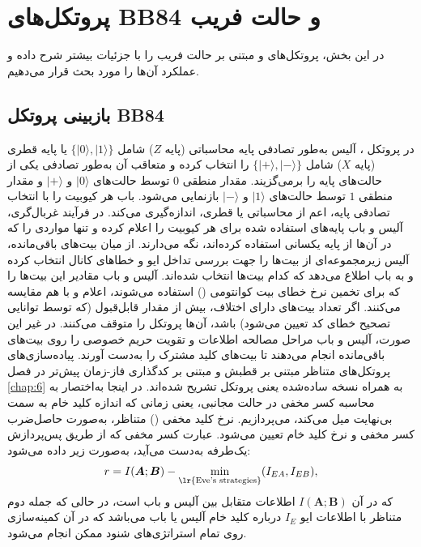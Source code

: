 \section{پروتکل‌های BB84 و حالت فریب}
\label{sec:8-1}
در این بخش، پروتکل‌های  و مبتنی بر حالت فریب را با جزئیات بیشتر شرح داده و عملکرد آن‌ها را مورد بحث قرار می‌دهیم.

\subsection{بازبینی پروتکل BB84}
\label{subsec:8-1-1}
در پروتکل  \cite{8-1, 8-2, 8-3, 8-4, 8-5}، آلیس به‌طور تصادفی پایه محاسباتی (پایه $Z$) شامل $\{|0\rangle, |1\rangle\}$ یا پایه قطری (پایه $X$) شامل $\{|+\rangle, |-\rangle\}$ را انتخاب کرده و متعاقب آن به‌طور تصادفی یکی از حالت‌های پایه را برمی‌گزیند. مقدار منطقی $0$ توسط حالت‌های $|0\rangle$ و $|+\rangle$ و مقدار منطقی $1$ توسط حالت‌های $|1\rangle$ و $|-\rangle$ بازنمایی می‌شود. باب هر کیوبیت را با انتخاب تصادفی پایه، اعم از محاسباتی یا قطری، اندازه‌گیری می‌کند. در فرآیند غربال‌گری، آلیس و باب پایه‌های استفاده شده برای هر کیوبیت را اعلام کرده و تنها مواردی را که در آن‌ها از پایه یکسانی استفاده کرده‌اند، نگه می‌دارند. از میان بیت‌های باقی‌مانده، آلیس زیرمجموعه‌ای از بیت‌ها را جهت بررسی تداخل ایو و خطاهای کانال انتخاب کرده و به باب اطلاع می‌دهد که کدام بیت‌ها انتخاب شده‌اند. آلیس و باب مقادیر این بیت‌ها را که برای تخمین نرخ خطای بیت کوانتومی () استفاده می‌شوند، اعلام و با هم مقایسه می‌کنند. اگر تعداد بیت‌های دارای اختلاف، بیش از مقدار قابل‌قبول (که توسط توانایی تصحیح خطای کد تعیین می‌شود) باشد، آن‌ها پروتکل را متوقف می‌کنند. در غیر این صورت، آلیس و باب مراحل مصالحه اطلاعات و تقویت حریم خصوصی را روی بیت‌های باقی‌مانده انجام می‌دهند تا بیت‌های کلید مشترک را به‌دست آورند. پیاده‌سازی‌های پروتکل‌های  متناظر مبتنی بر قطبش و مبتنی بر کدگذاری فاز-زمان پیش‌تر در فصل \ref{chap:6} به همراه نسخه ساده‌شده یعنی پروتکل  \cite{8-6} تشریح شده‌اند. در اینجا به‌اختصار به محاسبه کسر مخفی در حالت مجانبی، یعنی زمانی که اندازه کلید خام به سمت بی‌نهایت میل می‌کند، می‌پردازیم. نرخ کلید مخفی () متناظر، به‌صورت حاصل‌ضرب کسر مخفی و نرخ کلید خام تعیین می‌شود. عبارت کسر مخفی که از طریق پس‌پردازش یک‌طرفه به‌دست می‌آید، به‌صورت زیر داده می‌شود:
\begin{equation}
	r = I(\bm{A}; \bm{B}) - \min_{\text{\lr{Eve's strategies}}} (I_{EA}, I_{EB}),
	\label{eq:8-1}
\end{equation}
که در آن $I(\bm{A}; \bm{B})$ اطلاعات متقابل بین آلیس و باب است، در حالی که جمله دوم متناظر با اطلاعات ایو $I_E$ درباره کلید خام آلیس یا باب می‌باشد که در آن کمینه‌سازی روی تمام استراتژی‌های شنود ممکن انجام می‌شود.

